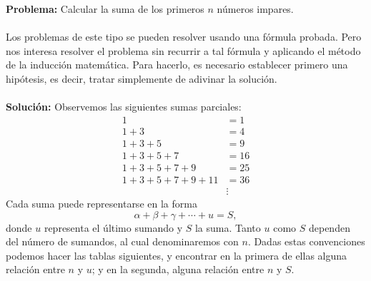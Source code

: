 \noindent
\textbf{\color{jblueleft}Problema:} Calcular la suma de los primeros $n$ números impares.\\
\,\\
Los problemas de este tipo se pueden resolver usando una fórmula probada. Pero nos interesa resolver el problema sin recurrir a tal fórmula y aplicando el método de la inducción matemática.
Para hacerlo, es necesario establecer primero una hipótesis, es decir, tratar simplemente de adivinar la solución.\\
\,\\
\textbf{\color{jblueleft}Solución:} Observemos las siguientes sumas parciales:
\begin{align*}
    1 &=1 \\
    1+3 &=4 \\
    1+3+5 &=9 \\
    1+3+5+7 &=16 \\
    1+3+5+7+9 &=25 \\
    1+3+5+7+9+11 &=36 \\
    & \vdots 
\end{align*}
Cada suma puede representarse en la forma
$$\alpha + \beta + \gamma + \cdots + u = S,$$
donde $u$ representa el último sumando y $S$ la suma. Tanto $u$ como $S$ dependen del número de sumandos, al cual denominaremos con $n$. Dadas estas convenciones podemos hacer las tablas siguientes, y encontrar en la primera de ellas alguna relación entre $n$ y $u$; y en la segunda, alguna relación entre $n$ y $S$.
